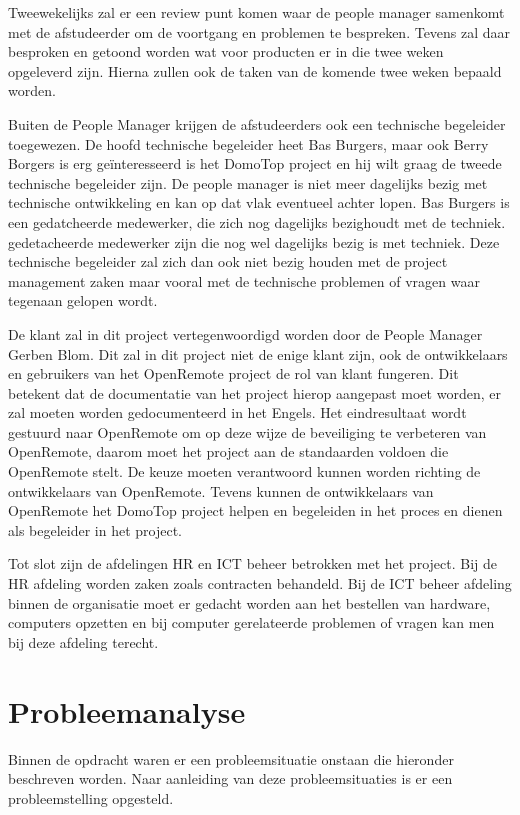 \documentclass[]{article}
\begin{document}
Tweewekelijks zal er een review punt komen waar de people manager
samenkomt met de afstudeerder om de voortgang en problemen te bespreken.
Tevens zal daar besproken en getoond worden wat voor producten er in die twee weken
opgeleverd zijn. Hierna zullen ook de taken van de komende twee weken
bepaald worden.

Buiten de People Manager krijgen de afstudeerders ook een technische
begeleider toegewezen. De hoofd technische begeleider heet Bas Burgers,
maar ook Berry Borgers is erg ge\"interesseerd is het DomoTop project en hij
wilt graag de tweede technische begeleider zijn. De people manager is
niet meer dagelijks bezig met technische ontwikkeling en kan op dat vlak
eventueel achter lopen. Bas Burgers is een gedatcheerde medewerker, die zich nog
dagelijks bezighoudt met de techniek.
gedetacheerde medewerker zijn die nog wel dagelijks bezig is met techniek.
Deze technische begeleider zal zich dan ook niet bezig houden met de
project management zaken maar vooral met de technische problemen of vragen
waar tegenaan gelopen wordt.

De klant zal in dit project vertegenwoordigd worden door de People Manager
Gerben Blom. Dit zal in dit project niet de enige klant zijn, ook de
ontwikkelaars en gebruikers van het OpenRemote project de rol van klant
fungeren. Dit betekent dat de documentatie van het project hierop aangepast
moet worden, er zal moeten worden gedocumenteerd in het Engels.  
Het eindresultaat wordt gestuurd naar OpenRemote om op deze wijze de beveiliging
te verbeteren van OpenRemote, daarom moet het project aan de standaarden voldoen die OpenRemote stelt. 
De keuze moeten verantwoord kunnen worden richting de ontwikkelaars van
OpenRemote. Tevens kunnen de ontwikkelaars van OpenRemote het DomoTop project helpen en begeleiden
in het proces en dienen als begeleider in het project.

Tot slot zijn de afdelingen HR en ICT beheer betrokken met het project. Bij
de HR afdeling worden zaken zoals contracten behandeld. Bij de ICT beheer
afdeling binnen de organisatie moet er gedacht worden aan het bestellen van
hardware, computers opzetten en bij computer gerelateerde problemen of
vragen kan men bij deze afdeling terecht.

\newpage
\section{Probleemanalyse}
Binnen de opdracht waren er een probleemsituatie onstaan die hieronder
beschreven worden. Naar aanleiding van deze probleemsituaties is er een
probleemstelling opgesteld.
\end{document}
